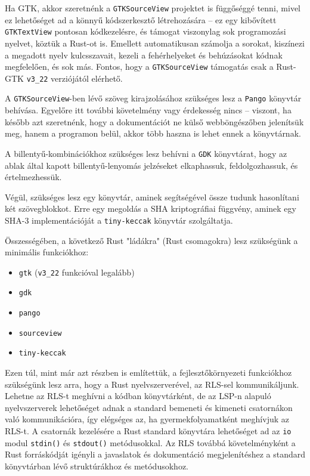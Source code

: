Ha GTK, akkor szeretnénk a \texttt{GTKSourceView} projektet is függőséggé tenni, 
mivel ez lehetőséget ad a könnyű kódszerkesztő létrehozására -- ez egy kibővített \texttt{GTKTextView} pontosan kódkezelésre,
és támogat viszonylag sok programozási nyelvet, köztük a Rust-ot is.
Emellett automatikusan számolja a sorokat, kiszínezi a megadott nyelv kulcsszavait, 
kezeli a fehérhelyeket és behúzásokat kódnak megfelelően, és sok más.
Fontos, hogy a \texttt{GTKSourceView} támogatás csak a Rust-GTK \texttt{v3\_22} verziójától elérhető.

A \texttt{GTKSourceView}-ben lévő szöveg kirajzolásához szükséges lesz a \texttt{Pango} könyvtár behívása.
Egyelőre itt további követelmény vagy érdekesség nincs -- viszont, ha később azt szeretnénk, 
hogy a dokumentációt ne külső webböngészőben jelenítsük meg, hanem a programon belül, akkor több haszna is lehet ennek a könyvtárnak.

A billentyű-kombinációkhoz szükséges lesz behívni a \texttt{GDK} könyvtárat, hogy az ablak által kapott
billentyű-lenyomás jelzéseket elkaphassuk, feldolgozhassuk, és értelmezhessük.

Végül, szükséges lesz egy könyvtár, aminek segítségével össze tudunk hasonlítani két szövegblokkot.
Erre egy megoldás a SHA kriptográfiai függvény, aminek egy SHA-3 implementációját a \texttt{tiny-keccak} könyvtár szolgáltatja.

Összességében, a következő Rust "ládákra" (Rust csomagokra) lesz szükségünk a minimális funkciókhoz:

\begin{itemize}
	\item \texttt{gtk} (\texttt{v3\_22} funkcióval legalább)
	\item \texttt{gdk}
	\item \texttt{pango}
	\item \texttt{sourceview}
	\item \texttt{tiny-keccak}
\end{itemize}

Ezen túl, mint már azt  részben is említettük, a fejlesztőkörnyezeti funkciókhoz szükségünk lesz arra,
hogy a Rust nyelvszerverével, az RLS-sel kommunikáljunk.
Lehetne az RLS-t meghívni a kódban könyvtárként, de az LSP-n\cite{lsp} alapuló nyelvszerverek lehetőséget
adnak a standard bemeneti és kimeneti csatornákon való kommunikációra, 
így elégséges az, ha gyermekfolyamatként meghívjuk az RLS-t.
A csatornák kezelésére a Rust standard könyvtára lehetőséget ad az \texttt{io} modul \texttt{stdin()}
és \texttt{stdout()} metódusokkal.
Az RLS továbbá követelményként a Rust forráskódját igényli a javaslatok és dokumentáció megjelenítéshez
a standard könyvtárban lévő struktúrákhoz és metódusokhoz.

